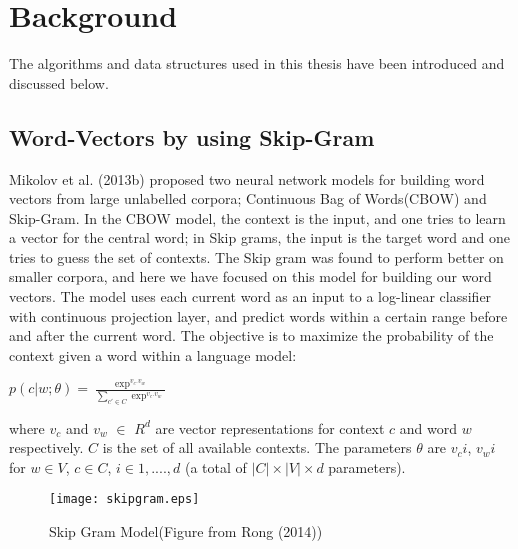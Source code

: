 \chapter{Background}
	The algorithms and data structures used in this thesis have been introduced and discussed below.
	\section{Word-Vectors by using Skip-Gram}
	\label{sec:skipgram}
Mikolov et al. (2013b) proposed two neural network models for building word
vectors from large unlabelled corpora; Continuous Bag of Words(CBOW) and
Skip-Gram.  In the 
CBOW model, the context is the input, and one tries to learn a vector
for the central word; in Skip grams, the 
input is the target word and one tries to guess the set of
contexts.  The Skip gram was found to 
perform better on smaller corpora, and
here we have focused on this model for building our word vectors. 
The model uses each current word as an input to a log-linear
classifier with continuous projection layer, and predict words within a
certain range before and after the current word. The objective is to maximize
the probability of the context given a word within a language model:

\begin{center} $p(c|w;\theta)=\frac{\exp^{v_c.v_w}}{\sum_{c' \in C}\exp^{v_c.v_w}}$ \end{center}
where $v_c$ and $v_w$ $\in$ $R^d$ are vector representations for context $c$ and word $w$ respectively. $C$ is the set of all available contexts. The parameters $\theta$ are $v_ci$, $v_wi$ for $w \in V$, $c \in C$, $i \in 1,....,d$ (a total of $|C| \times |V| \times d$ parameters).\\

\begin{figure}[ht!]
\centering
\texttt{[image: skipgram.eps]}
\caption{Skip Gram Model(Figure from Rong (2014)) \label{fig:skipgram}}
\end{figure}


